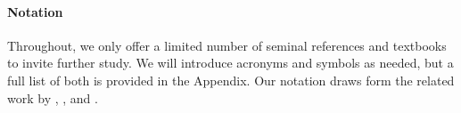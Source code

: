 \paragraph{Notation} Throughout, we only offer a limited number of seminal references and textbooks to invite further study. We will introduce acronyms and symbols as needed, but a full list of both is provided in the Appendix. Our notation draws form the related work by \cite{Puterman.1994}, \cite{Aguirregabiria.2010}, and \cite{Arcidiacono.2011}.
